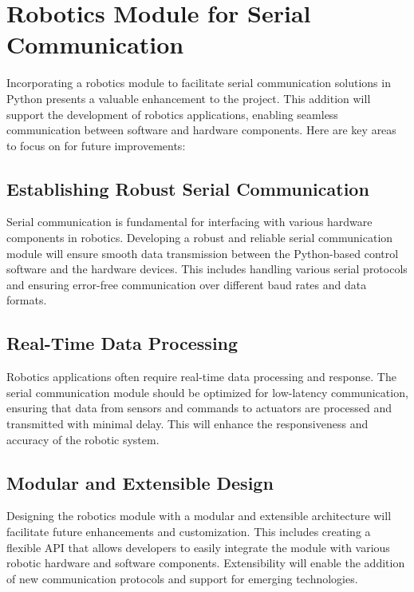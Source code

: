 \pagebreak




\section*{Robotics Module for Serial Communication}

Incorporating a robotics module to facilitate serial communication solutions in Python presents a valuable enhancement to the project. This addition will support the development of robotics applications, enabling seamless communication between software and hardware components. Here are key areas to focus on for future improvements:

\subsection*{Establishing Robust Serial Communication}

Serial communication is fundamental for interfacing with various hardware components in robotics. Developing a robust and reliable serial communication module will ensure smooth data transmission between the Python-based control software and the hardware devices. This includes handling various serial protocols and ensuring error-free communication over different baud rates and data formats.

\subsection*{Real-Time Data Processing}

Robotics applications often require real-time data processing and response. The serial communication module should be optimized for low-latency communication, ensuring that data from sensors and commands to actuators are processed and transmitted with minimal delay. This will enhance the responsiveness and accuracy of the robotic system.



\subsection*{Modular and Extensible Design}

Designing the robotics module with a modular and extensible architecture will facilitate future enhancements and customization. This includes creating a flexible API that allows developers to easily integrate the module with various robotic hardware and software components. Extensibility will enable the addition of new communication protocols and support for emerging technologies.

